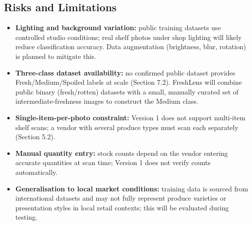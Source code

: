 \documentclass[12pt,a4paper]{article}
\begin{document}
\subsection{Risks and Limitations}
\label{sec:risks}

\begin{itemize}[leftmargin=1.2cm]
    \item \textbf{Lighting and background variation:} public training datasets use controlled studio conditions; real shelf photos under shop lighting will likely reduce classification accuracy. Data augmentation (brightness, blur, rotation) is planned to mitigate this.
    \item \textbf{Three-class dataset availability:} no confirmed public dataset provides Fresh/Medium/Spoiled labels at scale (Section 7.2). FreshLens will combine public binary (fresh/rotten) datasets with a small, manually curated set of intermediate-freshness images to construct the Medium class.
    \item \textbf{Single-item-per-photo constraint:} Version 1 does not support multi-item shelf scans; a vendor with several produce types must scan each separately (Section 5.2).
    \item \textbf{Manual quantity entry:} stock counts depend on the vendor entering accurate quantities at scan time; Version 1 does not verify counts automatically.
    \item \textbf{Generalisation to local market conditions:} training data is sourced from international datasets and may not fully represent produce varieties or presentation styles in local retail contexts; this will be evaluated during testing.
\end{itemize}

\end{document}
